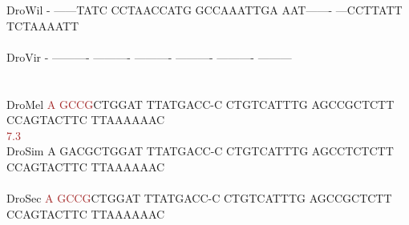 \documentclass[11pt,twoside,reqno,a4paper]{article}
\begin{document}
{DroWil	-	------TATC	CCTAACCATG	GCCAAATTGA	AAT-------	---CCTTATT	TCTAAAATT\\
\hspace*{7\charwidth}\hspace*{1\charwidth}\hspace*{1\charwidth}\hspace*{1\charwidth}\hspace*{1\charwidth}\hspace*{1\charwidth}\hspace*{1\charwidth}\\
DroVir	-	----------	----------	----------	----------	----------	---------\\
\hspace*{7\charwidth}\hspace*{1\charwidth}\hspace*{1\charwidth}\hspace*{1\charwidth}\hspace*{1\charwidth}\hspace*{1\charwidth}\hspace*{1\charwidth}\\
\\
DroMel	\textcolor{Brown}{A}	\textcolor{Brown}{G}\textcolor{Brown}{C}\textcolor{Brown}{C}\textcolor{Brown}{G}CTGGAT	TTATGACC-C	CTGTCATTTG	AGCCGCTCTT	CCAGTACTTC	TTAAAAAAC\\
\hspace*{7\charwidth}\hspace*{0\charwidth}\textcolor{Brown}{7.3}\hspace*{1\charwidth}\hspace*{1\charwidth}\hspace*{1\charwidth}\hspace*{1\charwidth}\hspace*{1\charwidth}\hspace*{1\charwidth}\\
DroSim	A	GACGCTGGAT	TTATGACC-C	CTGTCATTTG	AGCCTCTCTT	CCAGTACTTC	TTAAAAAAC\\
\hspace*{7\charwidth}\hspace*{1\charwidth}\hspace*{1\charwidth}\hspace*{1\charwidth}\hspace*{1\charwidth}\hspace*{1\charwidth}\hspace*{1\charwidth}\\
DroSec	\textcolor{Brown}{A}	\textcolor{Brown}{G}\textcolor{Brown}{C}\textcolor{Brown}{C}\textcolor{Brown}{G}CTGGAT	TTATGACC-C	CTGTCATTTG	AGCCGCTCTT	CCAGTACTTC	TTAAAAAAC\\
}
\end{document}
